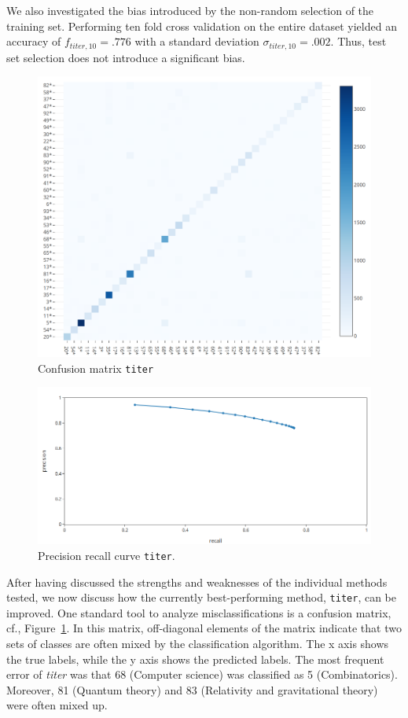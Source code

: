 We also investigated the bias introduced by the non-random selection of the training set.
Performing ten fold cross validation on the entire dataset yielded an accuracy of \(f_{titer,10} = .776\) with a standard deviation \(\sigma_{titer,10} = .002.\)
Thus, test set selection does not introduce a significant bias.


\begin{figure}[t]
  \centering
  \includegraphics[width=\textwidth]{confusion.png}
  \caption{Confusion matrix \texttt{titer}}\label{fgConfusion}
\end{figure}
\begin{figure}[t]
  \centering
  \includegraphics[width=\textwidth]{prcurve.png}
  \caption{Precision recall curve \texttt{titer}.}
  \label{fgPR}
\end{figure}

After having discussed the strengths and weaknesses of the individual methods tested, we now discuss how the currently best-performing method, \texttt{titer}, can be improved.
One standard tool to analyze misclassifications is a confusion matrix, cf., Figure~\ref{fgConfusion}.
In this matrix, off-diagonal elements of the matrix indicate that two sets of classes are often mixed by the classification algorithm.
The x axis shows the true labels, while the y axis shows the predicted labels.
The most frequent error of \emph{titer} was that 68 (Computer science) was classified as 5 (Combinatorics).
Moreover, 81 (Quantum theory) and 83 (Relativity and gravitational theory) were often mixed up.


